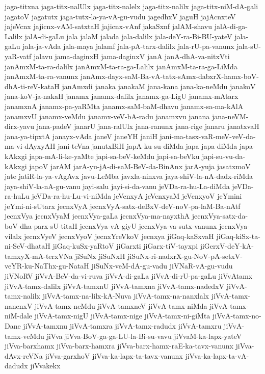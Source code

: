 {jaga-titxna
jaga-titx-nalUlx
jaga-titx-nalelx
jaga-titx-nalilx
jaga-titx-niM-dA-gali
jagatoV
jagatutx
jaga-tutx-la-ya-vA-gu-vudu
jagedhxV
jaguH
jajAcnxteV
jajeVcnx
jajicnx-vAM-satxtaH
jajicnx-vAnf
jakaSxnf
jalAM-shavu
jalA-di-ga-Lalilx
jalA-di-gaLu
jala
jalaM
jalada
jala-dalilx
jala-deY-ra-Bi-BU-yateV
jala-gaLu
jala-ja-vAda
jala-maya
jalamf
jala-pA-tarx-dalilx
jala-rU-pa-vanunx
jala-sU-yaR-vatf
jalavu
jama-daginxH
jama-daginxV
janA
janA-dhA-va-nitxVti
janAmxM-ta-ra-dalilx
janAmxM-ta-ra-ga-Lalilx
janAmxM-ta-ra-ga-LiMda
janAmxM-ta-ra-vanunx
janAmx-dayx-saM-Ba-vA-tatx-sAmx-dabxrX-hamx-boV-dhA-ti-reV-kataH
janAmxdi
janaka
janakaM
jana-kana
jana-ka-neMdu
janakoV
jana-koV-ja-nakaH
janamx
janamx-dalilx
janamx-ga-LigU
janamx-mAtarx
janamxnA
janamx-pa-yaRMta
janamx-saM-baM-dhavu
janamx-sa-ma-kAlA
janamxvU
janamx-veMdu
janamx-veV-bA-radu
janamxvu
janana
jana-neVM-dirx-yavu
jana-padeV
janarU
jana-ralUlx
jana-ranunx
jana-rige
janaru
janatxvaH
jana-ya-tipxtA
janayx-vAda
janeV
janeYH
janiH
jani-ma-tasx-vaR-meV-veV-da-ma-vi-dAyxyAH
jani-teVna
janutxBiH
japA-ku-su-diMda
japa
japa-diMda
japa-kAkxgi
japa-mA-li-ke-yaMte
japi-sa-beV-keMdu
japi-sa-beVku
japi-su-vu-da-kAkxgi
japoV
jarAM
jarA-yu-jA-di-saM-BeV-da-BinAnx
jarA-yuja
jasatxmoV
jate
jatiR-la-ya-vAgAvx
javu-LeMba
javxla-ninxva
jaya-shiV-la-nA-dadx-riMda
jaya-shiV-la-nA-gu-vanu
jayi-salu
jayi-si-da-vanu
jeVDa-ra-hu-La-diMda
jeVDa-ra-huLu
jeVDa-ra-hu-Lu-vi-niMda
jeVcnxyA
jeVcnxyaM
jeVcnxyoV
jeYmini
jeYmi-ni-sUtarx
jecnxVyA
jecnxVyA-satx-deBxV-deV-noV-pa-laM-Ba-nAtf
jecnxVya
jecnxVyaM
jecnxVya-gaLa
jecnxVya-ma-nayxthA
jecnxVya-satx-da-boV-dha-parx-sU-titaH
jecnxVya-vA-giyU
jecnxVya-va-sutx-vanunx
jecnxVya-vilalx
jecnxVyeV
jecnxVyoV
jecnxYreVkoV
jecnxya
jiGaq-kaSxvaH
jiGaq-kiSx-ta-ni-SeV-dhataH
jiGaq-kuSx-yaRtoV
jiGarxti
jiGarx-tiV-tayxpi
jiGerxV-deY-kA-tamxyX-mA-terxVNa
jiSuNx
jiSuNxH
jiSuNx-ri-nadxrX-gu-NoV-pA-setxV-veYR-ku-NaThx-gu-NataH
jiSuNx-veM-dA-gu-vadu
jiVNaR-vA-gu-vudu
jiVNoRV
jiVvA-BeV-da-vi-ruva
jiVvA-di-gaLa
jiVvA-di-rU-pa-gaLu
jiVvAtamx
jiVvA-tamx-dalilx
jiVvA-tamxnU
jiVvA-tamxna
jiVvA-tamx-nadedxV
jiVvA-tamx-nalilx
jiVvA-tamx-na-lilx-kA-Nuva
jiVvA-tamx-na-nanxlalx
jiVvA-tamx-nanenxV
jiVvA-tamx-neMdu
jiVvA-tamxneV
jiVvA-tamx-niMda
jiVvA-tamx-niM-dale
jiVvA-tamx-nigU
jiVvA-tamx-nige
jiVvA-tamx-ni-giMta
jiVvA-tamx-no-Dane
jiVvA-tamxnu
jiVvA-tamxra
jiVvA-tamx-radudx
jiVvA-tamxru
jiVvA-tamx-veMdu
jiVva
jiVva-BoV-ga-ga-LU-la-Bi-su-vavu
jiVvaM-ka-lapx-yateV
jiVva-barxhamx
jiVva-barx-hamxra
jiVva-barx-hamx-raE-ka-tavx-vanunx
jiVva-dAvx-reVNa
jiVva-garxhoV
jiVva-ka-lapx-ta-tavx-vanunx
jiVva-ka-lapx-ta-vA-dadudx
jiVvakekx
}
